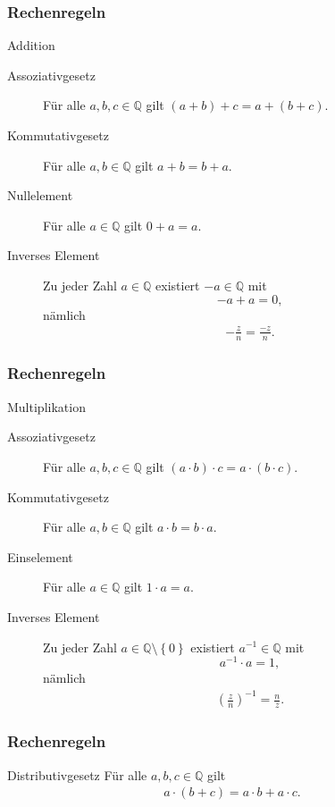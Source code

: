 \documentclass{beamer}
\newcommand\QQ{\mathbb Q}
\newcommand\bc[1]{\left({#1}\right)}
\newcommand\cbc[1]{\left\{{#1}\right\}}
\newcommand\bcfr[2]{\bc{\frac{#1}{#2}}}
\renewcommand{\ae}{\"a}
\newcommand{\ue}{\"u}
\begin{document}
\begin{frame}\frametitle{Rechenregeln}
	\begin{block}{Addition}
		\begin{description}
			\item[Assoziativgesetz] F\ue r alle $a,b,c\in\QQ$ gilt $(a+b)+c=a+(b+c)$.
			\item[Kommutativgesetz] F\ue r alle $a,b\in\QQ$ gilt $a+b=b+a$.
			\item[Nullelement] F\ue r alle $a\in\QQ$ gilt $0+a=a$.
			\item[Inverses Element] Zu jeder Zahl $a\in\QQ$ existiert $-a\in\QQ$ mit $$-a+a=0,$$ n\ae mlich
				\begin{align*}
				-\frac{z}{n}=\frac{-z}{n}.
				\end{align*}
		\end{description}
	\end{block}
\end{frame}

\begin{frame}\frametitle{Rechenregeln}
	\begin{block}{Multiplikation}
		\begin{description}
			\item[Assoziativgesetz] F\ue r alle $a,b,c\in\QQ$ gilt $(a\cdot b)\cdot c=a\cdot (b\cdot c)$.
			\item[Kommutativgesetz] F\ue r alle $a,b\in\QQ$ gilt $a\cdot b=b\cdot a$.
			\item[Einselement] F\ue r alle $a\in\QQ$ gilt $1\cdot a=a$.
			\item[Inverses Element] Zu jeder Zahl $a\in\QQ\setminus\cbc 0$ existiert $a^{-1}\in\QQ$ mit $$a^{-1}\cdot a=1,$$ n\ae mlich
				\begin{align*}
					\bcfr{z}{n}^{-1}=\frac{n}{z}.
				\end{align*}
		\end{description}
	\end{block}
\end{frame}

\begin{frame}\frametitle{Rechenregeln}
	\begin{block}{Distributivgesetz}
		F\ue r alle $a,b,c\in\QQ$ gilt	
		\begin{align*}
			a\cdot(b+c)=a\cdot b+a\cdot c.
		\end{align*}
	\end{block}
\end{frame}
\end{document}
